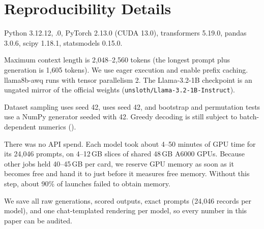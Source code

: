 \section{Reproducibility Details}
\label{app:repro}

 Python 3.12.12, .0, PyTorch 2.13.0 (CUDA 13.0), transformers 5.19.0, pandas 3.0.6, scipy 1.18.1, statsmodels 0.15.0.

 Maximum context length is 2{,}048--2{,}560 tokens (the longest prompt plus generation is 1{,}605 tokens). We use eager execution and enable prefix caching. llama8b-awq runs with tensor parallelism 2. The Llama-3.2-1B checkpoint is an ungated mirror of the official weights (\texttt{unsloth/Llama-3.2-1B-Instruct}).

 Dataset sampling uses seed 42, \vllm uses seed 42, and bootstrap and permutation tests use a NumPy generator seeded with 42. Greedy decoding is still subject to batch-dependent numerics ().

 There was no API spend. Each model took about 4--50 minutes of GPU time for its 24{,}046 prompts, on 4--12\,GB slices of shared 48\,GB A6000 GPUs. Because other jobs held 40--45\,GB per card, we reserve GPU memory as soon as it becomes free and hand it to \vllm just before it measures free memory. Without this step, about 90\% of launches failed to obtain memory.

 We save all raw generations, scored outputs, exact prompts (24{,}046 records per model), and one chat-templated rendering per model, so every number in this paper can be audited.
